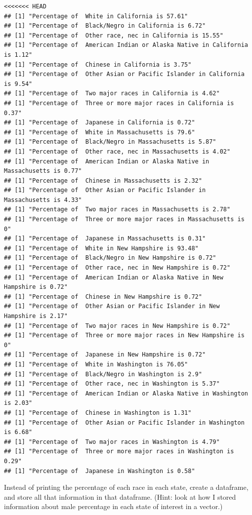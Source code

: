\documentclass[]{book}
\newenvironment{Shaded}{\begin{snugshade}}{\end{snugshade}}
\theoremstyle{definition}
\theoremstyle{definition}
\theoremstyle{definition}
\theoremstyle{remark}
\begin{document}
\begin{Shaded}
\begin{Highlighting}[]
\begin{Shaded}
\begin{Highlighting}[]
\begin{Shaded}
\begin{Highlighting}[]
\begin{verbatim}
<<<<<<< HEAD
## [1] "Percentage of  White in California is 57.61"
## [1] "Percentage of  Black/Negro in California is 6.72"
## [1] "Percentage of  Other race, nec in California is 15.55"
## [1] "Percentage of  American Indian or Alaska Native in California is 1.12"
## [1] "Percentage of  Chinese in California is 3.75"
## [1] "Percentage of  Other Asian or Pacific Islander in California is 9.54"
## [1] "Percentage of  Two major races in California is 4.62"
## [1] "Percentage of  Three or more major races in California is 0.37"
## [1] "Percentage of  Japanese in California is 0.72"
## [1] "Percentage of  White in Massachusetts is 79.6"
## [1] "Percentage of  Black/Negro in Massachusetts is 5.87"
## [1] "Percentage of  Other race, nec in Massachusetts is 4.02"
## [1] "Percentage of  American Indian or Alaska Native in Massachusetts is 0.77"
## [1] "Percentage of  Chinese in Massachusetts is 2.32"
## [1] "Percentage of  Other Asian or Pacific Islander in Massachusetts is 4.33"
## [1] "Percentage of  Two major races in Massachusetts is 2.78"
## [1] "Percentage of  Three or more major races in Massachusetts is 0"
## [1] "Percentage of  Japanese in Massachusetts is 0.31"
## [1] "Percentage of  White in New Hampshire is 93.48"
## [1] "Percentage of  Black/Negro in New Hampshire is 0.72"
## [1] "Percentage of  Other race, nec in New Hampshire is 0.72"
## [1] "Percentage of  American Indian or Alaska Native in New Hampshire is 0.72"
## [1] "Percentage of  Chinese in New Hampshire is 0.72"
## [1] "Percentage of  Other Asian or Pacific Islander in New Hampshire is 2.17"
## [1] "Percentage of  Two major races in New Hampshire is 0.72"
## [1] "Percentage of  Three or more major races in New Hampshire is 0"
## [1] "Percentage of  Japanese in New Hampshire is 0.72"
## [1] "Percentage of  White in Washington is 76.05"
## [1] "Percentage of  Black/Negro in Washington is 2.9"
## [1] "Percentage of  Other race, nec in Washington is 5.37"
## [1] "Percentage of  American Indian or Alaska Native in Washington is 2.03"
## [1] "Percentage of  Chinese in Washington is 1.31"
## [1] "Percentage of  Other Asian or Pacific Islander in Washington is 6.68"
## [1] "Percentage of  Two major races in Washington is 4.79"
## [1] "Percentage of  Three or more major races in Washington is 0.29"
## [1] "Percentage of  Japanese in Washington is 0.58"
\end{verbatim}

Instead of printing the percentage of each race in each state, create a dataframe, and store all that information in that dataframe. (Hint: look at how I stored information about male percentage in each state of interest in a vector.)


\end{Highlighting}
\end{Shaded}
\end{Highlighting}
\end{Shaded}
\end{Highlighting}
\end{Shaded}
\end{document}
